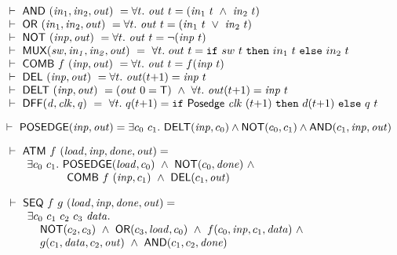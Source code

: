 \documentclass{llncs}
\begin{document}
\begin{footnotesize}

\medskip
$
\begin{array}{l}
\TURNST\ \DEF{AND}\ (\sVAR{in}{1},\sVAR{in}{2},\VAR{out}) ~ = 
   \forall t.\ \VAR{out}\ t = (\sVAR{in}{1}\ t\ \AND\ \sVAR{in}{2}\ t)\\
\TURNST\ \DEF{OR}\ (\sVAR{in}{1},\sVAR{in}{2},\VAR{out}) ~ =
   \forall t.\ \VAR{out}\ t = (\sVAR{in}{1}\ t\ \OR\ \sVAR{in}{2}\ t)\\
\TURNST\ \DEF{NOT}\ (\VAR{inp},\VAR{out}) ~ = 
   \forall t.\ \VAR{out}\ t = \NOT(\VAR{inp}\ t)\\
\TURNST\ \DEF{MUX} (\VAR{sw,in_1,in_2,out})~ =~
 \forall t.\ out~t =  \IF{sw~t}{in_1~t}{in_2~t}\\
\TURNST\ \DEF{COMB}\ f\ \VAR{(inp,out)} ~ = \forall t.\ \VAR{out}\ t = f (\VAR{inp}\ t)\\
\TURNST\ \DEF{DEL}\ (\VAR{inp},\VAR{out}) ~ = \forall t.\ \VAR{out} (t{+}1) = \VAR{inp}\ t\\
\TURNST\ \DEF{DELT}\ (\VAR{inp},\VAR{out}) ~ = 
    (\VAR{out}\ 0 = \DEF{T})\ \AND\ 
    \forall t.\ \VAR{out} (t{+}1) = \VAR{inp}\ t\\
\TURNST\ \DEF{DFF} (\VAR{d,clk,q})~ =~
 \forall t.\ q (t{+}1) =  \IF{\DEF{Posedge}\ \VAR{clk}\ (t{+}1)}{d (t{+}1)}{q\ t}
\end{array}
$
 
\smallskip

$
\mbox{}\hspace*{-0.4mm}\TURNST\ \DEF{POSEDGE} (\VAR{inp},\VAR{out}) = 
    \exists c_0~ c_1.\ \DEF{DELT}(\VAR{inp},c_0) \AND
                  \DEF{NOT}(c_0, c_1) \AND \DEF{AND}(c_1,\VAR{inp},\VAR{out})
$

\smallskip


$
\begin{array}{l}
\TURNST\ \DEF{ATM}\ f\ (\VAR{load,inp,done,out}) =\\
\phantom{\TURNST\ ~~}    \exists c_0~ c_1.\ \DEF{POSEDGE} (\VAR{load}, c_0)\ \AND \ 
\DEF{NOT} (c_0, \VAR{done})\ \AND\\
\phantom{\TURNST\ ~~\exists c_0, c_1.\ }  \DEF{COMB}\ f\ (\VAR{inp},c_1)\ \AND\ \DEF{DEL} (c_1,\VAR{out})
\end{array}
$

\smallskip

$
\begin{array}{l}
\TURNST\ \DEF{SEQ}\ f\ g\ (\VAR{load,inp,done,out}) = \\
\phantom{\TURNST\ ~~} \exists c_0~ c_1~ c_2~ c_3~ \VAR{data}.\\
\phantom{\TURNST\ ~~\exists~}                      \DEF{NOT} (c_2,c_3) \ \AND \ 
                      \DEF{OR} (c_3,\VAR{load},c_0) \ \AND \  f (c_0,\VAR{inp},c_1,\VAR{data}) \ \AND \\
\phantom{\TURNST\ ~~ \exists~} 
        g (c_1,\VAR{data},c_2,\VAR{out})\ \AND\ 
        \DEF{AND} (c_1,c_2,\VAR{done}) 
\end{array}
$


\end{footnotesize}
\end{document}
